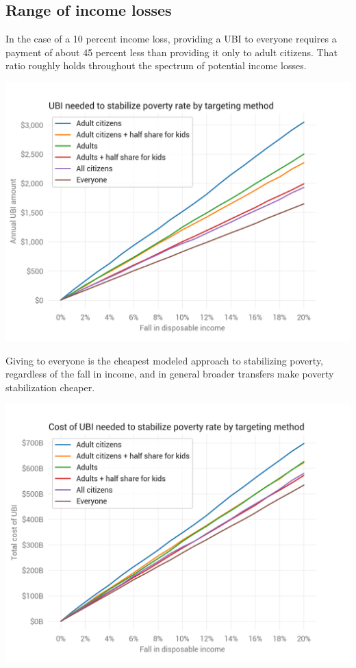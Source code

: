 \documentclass[12pt]{article}
\begin{document}
\subsection{Range of income losses} \label{sec:range_losses}

In the case of a 10 percent income loss, providing a UBI to everyone requires a payment of about 45 percent less than providing it only to adult citizens. That ratio roughly holds throughout the spectrum of potential income losses.

\begin{center}
\includegraphics[width=15cm]{ubi_pov_rate.png}
\label{fig:ubi_pov_rate}
\end{center}

Giving to everyone is the cheapest modeled approach to stabilizing poverty, regardless of the fall in income, and in general broader transfers make poverty stabilization cheaper.

\begin{center}
\includegraphics[width=15cm]{ubi_cost_pov_rate.png}
\label{fig:ubi_cost_pov_rate}
\end{center}
\end{document}
